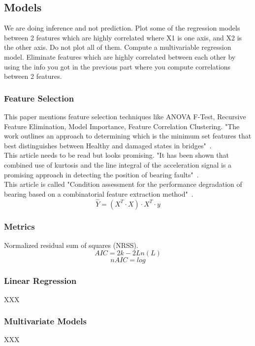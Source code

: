 \documentclass{article}
\begin{document}
\subsection{Models}
We are doing inference and not prediction.
Plot some of the regression models between 2 features which are highly correlated where X1 is one axis, and X2 is the other axis. Do not plot all of them.
Compute a multivariable regression model.
Eliminate features which are highly correlated between each other by using the info you got in the previous part where you compute correlations between 2 features.
\subsubsection{Feature Selection}
This paper mentions feature selection techniques like ANOVA F-Test, Recursive Feature Elimination, Model Importance, Feature Correlation Clustering. "The work outlines an approach to determining which is the minimum set features that best distinguishes between Healthy and damaged states in bridges"~\cite{buckley2023feature}.\\
This article needs to be read but looks promising. "It has been shown that combined use of kurtosis and the line integral of the acceleration signal is a promising approach in detecting the position of bearing faults"~\cite{kateris2014machine}.\\
This article is called "Condition assessment for the performance degradation of bearing based on a combinatorial feature extraction method"~\cite{hong2014condition}.
$$ \hat{Y} = (X^T \cdot X) \cdot X^T \cdot y $$
\subsubsection{Metrics}
Normalized residual sum of squares (NRSS).
$$ AIC = 2k - 2Ln(L) $$  
$$ nAIC = log $$
\subsubsection{Linear Regression}
XXX
\subsubsection{Multivariate Models}
XXX
\end{document}
